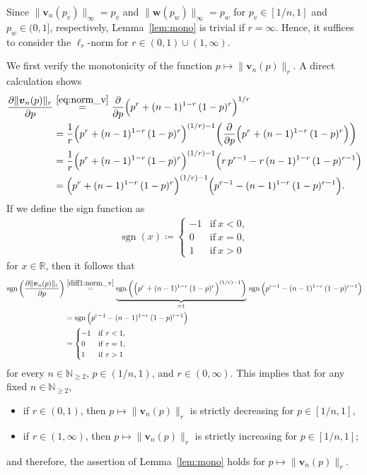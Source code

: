 \documentclass[conference, draftcls, onecolumn]{IEEEtran}
\theoremstyle{plain}
\newcommand{\bvec}[1]{\boldsymbol{#1}}
\newcommand{\sgn}{\operatorname{sgn}}
\newcommand{\lemref}[1]{Lemma~\ref{#1}}
\begin{document}
\begin{IEEEproof}[Proof of \lemref{lem:mono}]
Since $\| \bvec{v}_{n}( p_{v} ) \|_{\infty} = p_{v}$ and $\| \bvec{w}( p_{w} ) \|_{\infty} = p_{w}$ for $p_{v} \in [1/n, 1]$ and $p_{w} \in (0, 1]$, respectively,
\lemref{lem:mono} is trivial if $r = \infty$.
Hence, it suffices to consider the $\ell_{r}$-norm for $r \in (0, 1) \cup (1, \infty)$.

We first verify the monotonicity of the function $p \mapsto \| \bvec{v}_{n}( p ) \|_{r}$.
A direct calculation shows
\begin{align}
\frac{ \partial \| \bvec{v}_{n}( p ) \|_{r} }{ \partial p }
& \overset{\eqref{eq:norm_v}}{=}
\frac{ \partial }{ \partial p } \Big( p^{r} + (n-1)^{1-r} \, (1-p)^{r} \Big)^{1/r}
\\
& =
\frac{1}{r} \Big( p^{r} + (n-1)^{1-r} \, (1-p)^{r} \Big)^{(1/r)-1} \bigg( \frac{ \partial }{ \partial p } \Big( p^{r} + (n-1)^{1-r} \, (1-p)^{r} \Big) \bigg)
\\
& =
\frac{1}{r} \Big( p^{r} + (n-1)^{1-r} \, (1-p)^{r} \Big)^{(1/r)-1} \Big( r \, p^{r-1} - r \, (n-1)^{1-r} \, (1-p)^{r-1} \Big)
\\
& =
\Big( p^{r} + (n-1)^{1-r} \, (1-p)^{r} \Big)^{(1/r)-1} \Big( p^{r-1} - (n-1)^{1-r} \, (1-p)^{r-1} \Big) .
\label{diff1:norm_v}
\end{align}
If we define the sign function as
\begin{align}
\sgn( x )
\coloneqq
\begin{cases}
- 1
& \mathrm{if} \ x < 0 ,
\\
0
& \mathrm{if} \ x = 0 ,
\\
1
& \mathrm{if} \ x > 0
\end{cases}
\end{align}
for $x \in \mathbb{R}$, then it follows that
\begin{align}
\sgn \bigg( \frac{ \partial \| \bvec{v}_{n}( p ) \|_{r} }{ \partial p } \bigg)
& \overset{\eqref{diff1:norm_v}}{=}
\underbrace{ \sgn\bigg( \Big( p^{r} + (n-1)^{1-r} \, (1-p)^{r} \Big)^{(1/r)-1} \bigg) }_{=1} \, \sgn\Big( p^{r-1} - (n-1)^{1-r} \, (1-p)^{r-1} \Big)
\\
& =
\sgn\Big( p^{r-1} - (n-1)^{1-r} \, (1-p)^{r-1} \Big)
\\
& =
\begin{cases}
-1
& \mathrm{if} \ r < 1 ,
\\
0
& \mathrm{if} \ r = 1 ,
\\
1
& \mathrm{if} \ r > 1
\end{cases}
\label{eq:sgn_norm_v_diff1}
\end{align}
for every $n \in \mathbb{N}_{\ge 2}$, $p \in (1/n, 1)$, and $r \in (0, \infty)$.
This implies that for any fixed $n \in \mathbb{N}_{\ge 2}$,
\begin{itemize}
\item
if $r \in (0, 1)$, then $p \mapsto \| \bvec{v}_{n}( p ) \|_{r}$ is strictly decreasing for $p \in [1/n, 1]$,
\item
if $r \in (1, \infty)$, then $p \mapsto \| \bvec{v}_{n}( p ) \|_{r}$ is strictly increasing for $p \in [1/n, 1]$;
\end{itemize}
and therefore, the assertion of \lemref{lem:mono} holds for $p \mapsto \| \bvec{v}_{n}( p ) \|_{r}$.


\end{IEEEproof}
\end{document}
